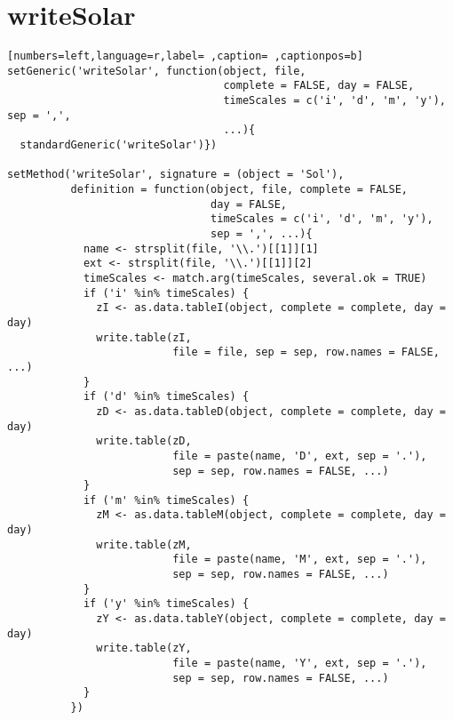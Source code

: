 \section{writeSolar}
\label{sec:org9463fbf}
\begin{lstlisting}[numbers=left,language=r,label= ,caption= ,captionpos=b]
setGeneric('writeSolar', function(object, file,
                                  complete = FALSE, day = FALSE,
                                  timeScales = c('i', 'd', 'm', 'y'), sep = ',',
                                  ...){
  standardGeneric('writeSolar')})

setMethod('writeSolar', signature = (object = 'Sol'),
          definition = function(object, file, complete = FALSE,
                                day = FALSE,
                                timeScales = c('i', 'd', 'm', 'y'),
                                sep = ',', ...){
            name <- strsplit(file, '\\.')[[1]][1]
            ext <- strsplit(file, '\\.')[[1]][2]
            timeScales <- match.arg(timeScales, several.ok = TRUE)
            if ('i' %in% timeScales) {
              zI <- as.data.tableI(object, complete = complete, day = day)
              write.table(zI,
                          file = file, sep = sep, row.names = FALSE, ...)
            }
            if ('d' %in% timeScales) {
              zD <- as.data.tableD(object, complete = complete, day = day)
              write.table(zD,
                          file = paste(name, 'D', ext, sep = '.'),
                          sep = sep, row.names = FALSE, ...)
            }
            if ('m' %in% timeScales) {
              zM <- as.data.tableM(object, complete = complete, day = day)
              write.table(zM,
                          file = paste(name, 'M', ext, sep = '.'),
                          sep = sep, row.names = FALSE, ...)
            }
            if ('y' %in% timeScales) {
              zY <- as.data.tableY(object, complete = complete, day = day)
              write.table(zY,
                          file = paste(name, 'Y', ext, sep = '.'),
                          sep = sep, row.names = FALSE, ...)
            }
          })
\end{lstlisting}
